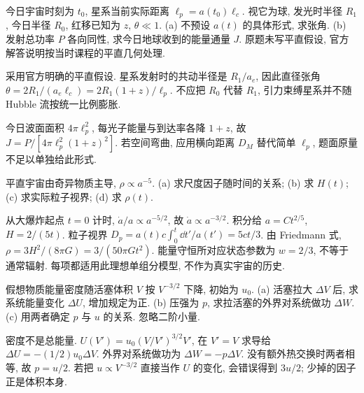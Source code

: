 \begin{exercise}
今日宇宙时刻为 $t_0$, 星系当前实际距离 $\ell_p=a(t_0)\ell_c$. 视它为球, 发光时半径 $R_1$, 今日半径 $R_0$, 红移已知为 $z$, $\theta\ll1$.
(a) 不预设 $a(t)$ 的具体形式, 求张角.
(b) 发射总功率 $P$ 各向同性, 求今日地球收到的能量通量 $J$. 原题未写平直假设, 官方解答说明按当时课程的平直几何处理.
\end{exercise}
\begin{solution}
采用官方明确的平直假设. 星系发射时的共动半径是 $R_1/a_e$, 因此直径张角 $\theta=2R_1/(a_e\ell_c)=2R_1(1+z)/\ell_p$. 不应把 $R_0$ 代替 $R_1$, 引力束缚星系并不随 Hubble 流按统一比例膨胀.

今日波面面积 $4\pi\ell_p^2$, 每光子能量与到达率各降 $1+z$, 故 $J=P/[4\pi\ell_p^2(1+z)^2]$. 若空间弯曲, 应用横向距离 $D_M$ 替代简单 $\ell_p$, 题面原量不足以单独给此形式.
\end{solution}

\begin{exercise}
平直宇宙由奇异物质主导, $\rho\propto a^{-5}$.
(a) 求尺度因子随时间的关系; (b) 求 $H(t)$; (c) 求实际粒子视界; (d) 求 $\rho(t)$.
\end{exercise}
\begin{solution}
从大爆炸起点 $t=0$ 计时, $\dot a/a\propto a^{-5/2}$, 故 $\dot a\propto a^{-3/2}$. 积分给 $a=Ct^{2/5}$, $H=2/(5t)$. 粒子视界 $D_p=a(t)c\int_0^t\dd t'/a(t')=5ct/3$. 由 Friedmann 式, $\rho=3H^2/(8\pi G)=3/(50\pi Gt^2)$. 能量守恒所对应状态参数为 $w=2/3$, 不等于通常辐射. 每项都适用此理想单组分模型, 不作为真实宇宙的历史.
\end{solution}

\begin{exercise}
假想物质能量密度随活塞体积 $V$ 按 $V^{-3/2}$ 下降, 初始为 $u_0$.
(a) 活塞拉大 $\Delta V$ 后, 求系统能量变化 $\Delta U$, 增加规定为正.
(b) 压强为 $p$, 求拉活塞的外界对系统做功 $\Delta W$.
(c) 用两者确定 $p$ 与 $u$ 的关系. 忽略二阶小量.
\end{exercise}
\begin{solution}
密度不是总能量. $U(V')=u_0(V/V')^{3/2}V'$, 在 $V'=V$ 求导给 $\Delta U=-(1/2)u_0\Delta V$. 外界对系统做功为 $\Delta W=-p\Delta V$. 没有额外热交换时两者相等, 故 $p=u/2$. 若把 $u\propto V^{-3/2}$ 直接当作 $U$ 的变化, 会错误得到 $3u/2$; 少掉的因子正是体积本身.
\end{solution}

